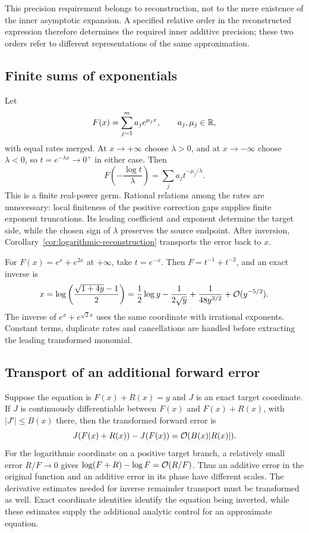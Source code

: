 This precision requirement belongs to reconstruction, not to the mere existence of the inner asymptotic expansion. A specified relative order in the reconstructed expression therefore determines the required inner additive precision; these two orders refer to different representations of the same approximation.

\subsection{Finite sums of exponentials}

Let
\[
 F(x)=\sum_{j=1}^m a_j e^{\mu_j x},
 \qquad a_j,\mu_j\in\mathbb R,
\]
with equal rates merged. At $x\to+\infty$ choose $\lambda>0$, and at $x\to-\infty$ choose $\lambda<0$, so $t=e^{-\lambda x}\to0^+$ in either case. Then
\begin{equation}
 F\left(-\frac{\log t}{\lambda}\right)
 =\sum_j a_j t^{-\mu_j/\lambda}.
 \label{eq:finite-exponential-coordinate}
\end{equation}
This is a finite real-power germ. Rational relations among the rates are unnecessary: local finiteness of the positive correction gaps supplies finite exponent truncations. Its leading coefficient and exponent determine the target side, while the chosen sign of $\lambda$ preserves the source endpoint. After inversion, Corollary~\ref{cor:logarithmic-reconstruction} transports the error back to $x$.

\begin{example}
For $F(x)=e^x+e^{2x}$ at $+\infty$, take $t=e^{-x}$. Then $F=t^{-1}+t^{-2}$, and an exact inverse is
\[
 x=\log\left(\frac{\sqrt{1+4y}-1}{2}\right)
 =\frac12\log y-\frac1{2\sqrt y}
 +\frac1{48y^{3/2}}+\mathcal O(y^{-5/2}).
\]
The inverse of $e^x+e^{\sqrt2 x}$ uses the same coordinate with irrational exponents. Constant terms, duplicate rates and cancellations are handled before extracting the leading transformed monomial.
\end{example}

\subsection{Transport of an additional forward error}

Suppose the equation is $F(x)+R(x)=y$ and $J$ is an exact target coordinate.
If $J$ is continuously differentiable between $F(x)$ and $F(x)+R(x)$,
with $|J'|\le B(x)$ there, then the transformed forward error is
\[
 J(F(x)+R(x))-J(F(x))=\mathcal O(B(x)|R(x)|).
\]
For the logarithmic coordinate on a positive target branch, a relatively
small error $R/F\to0$ gives $\log(F+R)-\log F=\mathcal O(R/F)$.
Thus an additive error in the original function and an additive error in
its phase have different scales. The derivative estimates needed for
inverse remainder transport must be transformed as well. Exact coordinate
identities identify the equation being inverted, while these estimates
supply the additional analytic control for an approximate equation.
